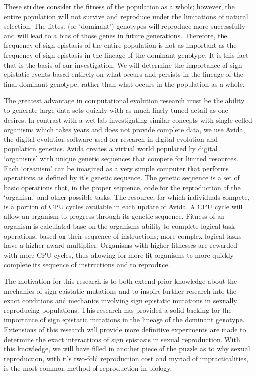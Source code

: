 \documentclass[a4paper, 10pt]{article}
\begin{document}
These studies consider the fitness of the population as a whole; however, the entire population will not survive and reproduce under the limitations of natural selection. The fittest (or `dominant') genotypes will reproduce more successfully and will lead to a bias of those genes in future generations. Therefore, the frequency of sign epistasis of the entire population is not as important as the frequency of sign epistasis in the lineage of the dominant genotype. It is this fact that is the basis of our investigation. We will determine the importance of sign epistatic events based entirely on what occurs and persists in the lineage of the final dominant genotype, rather than what occurs in the population as a whole.

The greatest advantage in computational evolution research must be the ability to generate large data sets quickly with as much finely-tuned detail as one desires. In contrast with a wet-lab investigating similar concepts with single-celled organisms which takes years and does not provide complete data, we use Avida, the digital evolution software used for research in digital evolution and population genetics. Avida creates a virtual world populated by digital `organisms' with unique genetic sequences that compete for limited resources. Each `organism' can be imagined as a very simple computer that performs operations as defined by it's genetic sequence. The genetic sequence is a set of basic operations that, in the proper sequence, code for the reproduction of the `organism' and other possible tasks.  The resource, for which individuals compete, is a portion of CPU cycles available in each update of Avida. A CPU cycle will allow an organism to progress through its genetic sequence. Fitness of an organism is calculated base on the organisms ability to complete logical task operations, based on their sequence of instructions; more complex logical tasks have a higher award multiplier. Organisms with higher fitnesses are rewarded with more CPU cycles, thus allowing for more fit organisms to more quickly complete its sequence of instructions and to reproduce.

The motivation for this research is to both extend prior knowledge about the mechanics of sign epistatic mutations and to inspire further research into the exact conditions and mechanics involving sign epistatic mutations in sexually reproducing populations. This research has provided a solid backing for the importance of sign epistatic mutations in the lineage of the dominant genotype. Extensions of this research will provide more definitive experiments are made to determine the exact interactions of sign epistasis in sexual reproduction. With this knowledge, we will have filled in another piece of the puzzle as to why sexual reproduction, with it's two-fold reproduction cost and myriad of impracticalities, is the most common method of reproduction in biology. 
\end{document}
